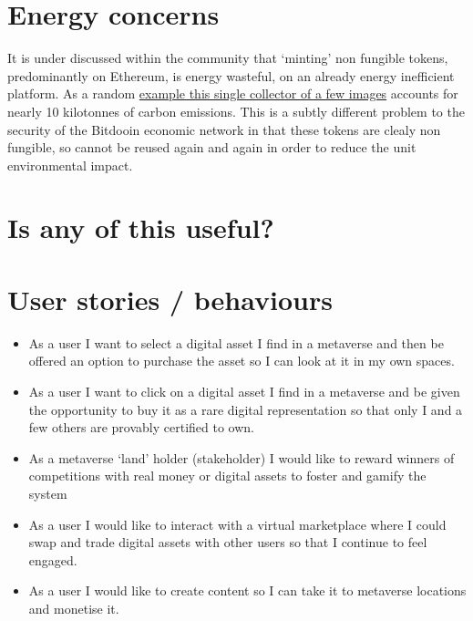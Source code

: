 \section{Energy concerns}
It is under discussed within the community that `minting' non fungible tokens, predominantly on Ethereum, is energy wasteful, on an already energy inefficient platform. As a random \href{https://carbon.fyi/?address=0x6Ec30Fd91A504Aad948839B985C7263888B2Ad68} {example this single collector of a few images} accounts for nearly 10 kilotonnes of carbon emissions. This is a subtly different problem to the security of the Bitdooin economic network in that these tokens are clealy non fungible, so cannot be reused again and again in order to reduce the unit environmental impact. 

\section{Is any of this useful?}

\section{User stories / behaviours}
\label{behaviours}

\begin{itemize}
\item As a user I want to select a digital asset I find in a metaverse and then be offered an option to purchase the asset so I can look at it in my own spaces.
\item As a user I want to click on a digital asset I find in a metaverse and be given the opportunity to buy it as a rare digital representation so that only I and a few others are provably certified to own.
\item As a metaverse `land' holder (stakeholder) I would like to reward winners of competitions with real money or digital assets to foster and gamify the system
\item As a user I would like to interact with a virtual marketplace where I could swap and trade digital assets with other users so that I continue to feel engaged.
\item As a user I would like to create content so I can take it to metaverse locations and monetise it.
\end{itemize}

